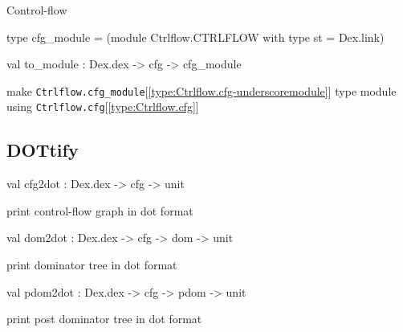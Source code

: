 \documentclass[11pt]{article}
\begin{document}
\begin{ocamldocdescription}
Control-flow


\end{ocamldocdescription}




\label{type:Ctrlflow.cfg-underscoremodule}\begin{ocamldoccode}
type cfg_module = (module Ctrlflow.CTRLFLOW with type st = Dex.link) 
\end{ocamldoccode}




\label{val:Ctrlflow.to-underscoremodule}\begin{ocamldoccode}
val to_module : Dex.dex -> cfg -> cfg_module
\end{ocamldoccode}
\begin{ocamldocdescription}
make {\tt{Ctrlflow.cfg\_module}}[\ref{type:Ctrlflow.cfg-underscoremodule}] type module using {\tt{Ctrlflow.cfg}}[\ref{type:Ctrlflow.cfg}]


\end{ocamldocdescription}




\subsection{DOTtify}




\label{val:Ctrlflow.cfg2dot}\begin{ocamldoccode}
val cfg2dot : Dex.dex -> cfg -> unit
\end{ocamldoccode}
\begin{ocamldocdescription}
print control-flow graph in dot format


\end{ocamldocdescription}




\label{val:Ctrlflow.dom2dot}\begin{ocamldoccode}
val dom2dot : Dex.dex -> cfg -> dom -> unit
\end{ocamldoccode}
\begin{ocamldocdescription}
print dominator tree in dot format


\end{ocamldocdescription}




\label{val:Ctrlflow.pdom2dot}\begin{ocamldoccode}
val pdom2dot : Dex.dex -> cfg -> pdom -> unit
\end{ocamldoccode}
\begin{ocamldocdescription}
print post dominator tree in dot format


\end{ocamldocdescription}
\end{document}

